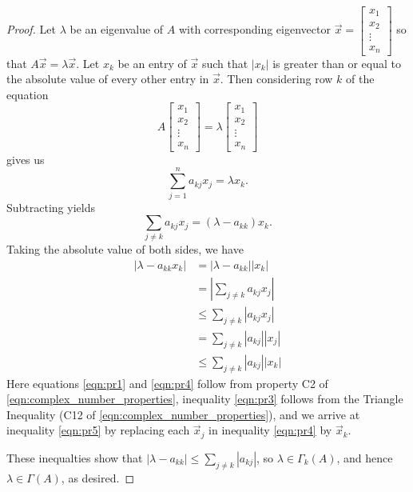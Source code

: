 \documentclass{ximera}
\begin{document}
\begin{proof}
Let $\lambda$ be an eigenvalue of $A$ with corresponding eigenvector $\vec{x}=\begin{bmatrix}
x_1 \\ x_2 \\ \vdots \\ x_n
\end{bmatrix}$ so that $A\vec{x}=\lambda\vec{x}$. Let $x_k$ be an entry of $\vec{x}$ such that $|x_k|$ is greater than or equal to the absolute value of every other entry in $\vec{x}$.  Then considering row $k$ of the equation $$A\begin{bmatrix}
x_1 \\ x_2 \\ \vdots \\ x_n
\end{bmatrix}=\lambda\begin{bmatrix}
x_1 \\ x_2 \\ \vdots \\ x_n
\end{bmatrix}$$ gives us 
$$\sum_{j=1}^n a_{kj} x_j = \lambda x_k.$$
Subtracting yields 
$$\sum_{j\ne k} a_{kj} x_j = (\lambda - a_{kk}) x_k.$$
Taking the absolute value of both sides, we have
\begin{align}
    |\lambda - a_{kk} x_k| &= |\lambda - a_{kk}| |x_k|\label{eqn:pr1} \\ 
    &= \left|\sum_{j\ne k} a_{kj} x_j\right| \label{eqn:pr2} \\ 
    &\le \sum_{j\ne k} |a_{kj} x_j| \label{eqn:pr3} \\ 
    &= \sum_{j\ne k} |a_{kj}| |x_j| \label{eqn:pr4}\\ 
    &\le \sum_{j\ne k} |a_{kj}| |x_k| \label{eqn:pr5}
\end{align}
Here equations \ref{eqn:pr1} and \ref{eqn:pr4} follow from property C2 of \ref{eqn:complex_number_properties}, inequality \ref{eqn:pr3} follows from the Triangle Inequality (C12 of \ref{eqn:complex_number_properties}), and we arrive at inequality \ref{eqn:pr5} by replacing each $\vec{x}_j$ in inequality \ref{eqn:pr4} by $\vec{x}_k$.

These inequalties show that $|\lambda - a_{kk}| \le \sum_{j\ne k} |a_{kj}|$, so $\lambda \in \Gamma_k(A)$, and hence $\lambda \in \Gamma(A)$, as desired.


\end{proof}
\end{document}
